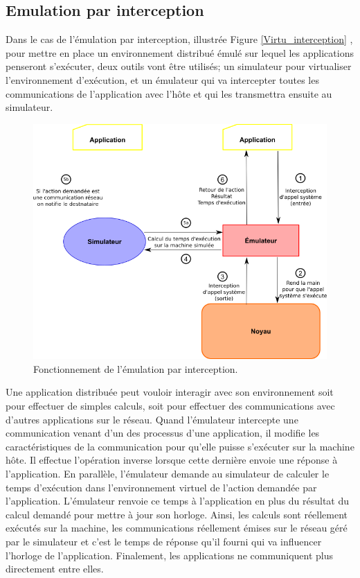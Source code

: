 \subsection{Emulation par interception}
\label{section:interception}

Dans le cas de l'émulation par interception, illustrée
Figure \ref{Virtu_interception} , pour mettre en place un environnement distribué
émulé sur lequel les applications penseront s'exécuter, deux outils vont être
utilisés; un simulateur pour virtualiser l'environnement d'exécution, et un
émulateur qui va intercepter toutes les communications de l'application avec l'hôte
et qui les transmettra ensuite au simulateur.

 \begin{figure}[H]
   \centering \includegraphics[scale=0.5]{Pictures/png/Emulation_fonctionnement}
   \caption{Fonctionnement de l'émulation par interception.}
   \label{INTERCEPTION}
 \end{figure}
 
 Une application distribuée peut vouloir interagir avec son environnement soit
 pour effectuer de simples calculs, soit pour effectuer des communications avec
 d'autres applications sur le réseau. Quand l'émulateur intercepte une
 communication venant d'un des processus d'une application, il modifie les
 caractéristiques de la communication pour qu'elle puisse s'exécuter sur la
 machine hôte. Il effectue l'opération inverse lorsque cette dernière envoie une réponse à
 l'application. En parallèle, l'émulateur demande au simulateur de calculer le
 temps d'exécution dans l'environnement virtuel de l'action
 demandée par l'application. L'émulateur renvoie ce temps à l'application en plus
 du résultat du calcul demandé pour mettre à jour son horloge. Ainsi, les
 calculs sont réellement exécutés sur la machine, les communications réellement
 émises sur le réseau géré par le simulateur et c'est le temps de réponse qu'il
 fourni qui va influencer l'horloge de l'application. Finalement, les
 applications ne communiquent plus directement entre elles.

